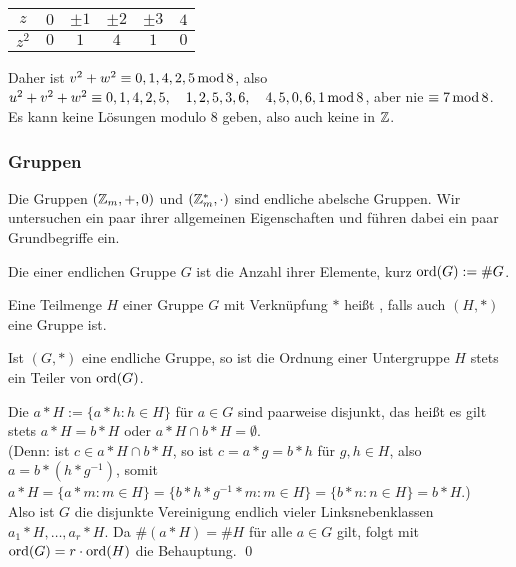 \begin{itemize}
		\begin{center}
			\begin{tabular}{c||c|c|c|c|c}
			$z$ & $0$ & $\pm 1$ & $\pm 2$ & $\pm 3$ & $4$ \\ 
			\hline $z^2$ & $0$ & $1$ & $4$ & $1$ & $0$ \\ 
			\end{tabular} 
		\end{center}
		Daher ist $v^2 + w^2 \equiv 0,1,4,2,5 \operatorname{mod} 8$, also $u^2+v^2+w^2 \equiv 0,1,4,2,5, \quad 1,2,5,3,6, \quad 4,5,0,6,1 \operatorname{mod} 8$, aber nie $\equiv 7 \operatorname{mod} 8$. Es kann keine Lösungen modulo $8$ geben, also auch keine in $\mathbb{Z}$.
	\end{itemize}

\subsubsection{Gruppen}
\label{subsub:1.1.3}
	Die Gruppen $(\mathbb{Z}_m,+,0)$ und $(\mathbb{Z}_m^*,\cdot)$ sind endliche abelsche Gruppen.\marginnote{[4]} Wir untersuchen ein paar ihrer allgemeinen Eigenschaften und führen dabei ein paar Grundbegriffe ein.
	
\begin{defn}[Gruppenordnung]
	Die  einer endlichen Gruppe $G$ ist die Anzahl ihrer Elemente, kurz $\operatorname{ord}(G) := \#G$.
\end{defn}

\begin{defn}[Untergruppe]
	Eine Teilmenge $H$ einer Gruppe $G$ mit Verknüpfung $*$ heißt , falls auch $(H,*)$ eine Gruppe ist.
\end{defn}

\begin{satz}
\label{satz_lagrange}
	Ist $(G,*)$ eine endliche Gruppe, so ist die Ordnung einer Untergruppe $H$ stets ein Teiler von $\operatorname{ord}(G)$. 
\end{satz}

	Die  $a*H := \{ a * h : h \in H\}$ für $a \in G$ sind paarweise disjunkt, das heißt es gilt stets $a * H = b * H$ oder $a * H \cap b * H = \emptyset$. \\
	(Denn: ist $c \in a * H \cap b * H$, so ist $c = a * g = b * h$ für $g,h \in H$, also $a = b * (h * g^{-1})$, somit $a*H = \{a * m : m \in H\} = \{b * h * g^{-1} * m : m \in H\} = \{b * n : n \in H\} = b * H$.) \\
	Also ist $G$ die disjunkte Vereinigung endlich vieler Linksnebenklassen $a_1 * H, \dots, a_r * H$. Da $\#(a*H) = \#H$ für alle $a \in G$ gilt, folgt mit $\operatorname{ord}(G) = r \cdot \operatorname{ord}(H)$ die Behauptung. \qed
	

